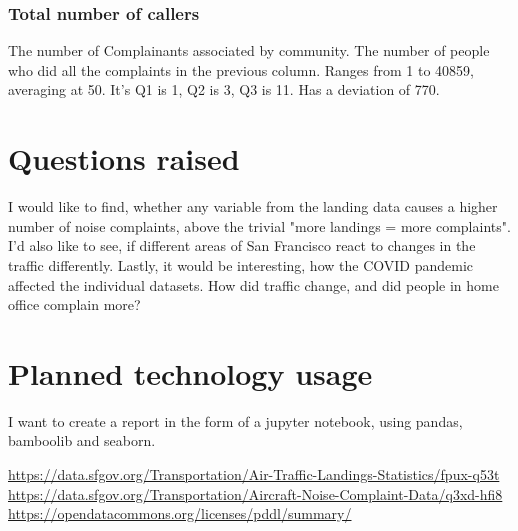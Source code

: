 \documentclass[a4paper,11pt]{article}
\begin{document}
        \subsubsection{Total number of callers}
        The number of Complainants associated by community. The number of people who did all the complaints
        in the previous column.
        Ranges from 1 to 40859, averaging at 50. It's Q1 is 1, Q2 is 3, Q3 is 11. Has a deviation of 770.

    \section{Questions raised}
    I would like to find, whether any variable from the landing data causes a higher number of noise complaints,
    above the trivial "more landings = more complaints". I'd also like to see, if different areas of San
    Francisco react to changes in the traffic differently. Lastly, it would be interesting, how the COVID
    pandemic affected the individual datasets. How did traffic change, and did people in home office complain more?

    \section{Planned technology usage}
    I want to create a report in the form of a jupyter notebook, using pandas, bamboolib and seaborn.


    \begin{thebibliography}{9}
        \url{https://data.sfgov.org/Transportation/Air-Traffic-Landings-Statistics/fpux-q53t}
        \url{https://data.sfgov.org/Transportation/Aircraft-Noise-Complaint-Data/q3xd-hfi8}
        \url{https://opendatacommons.org/licenses/pddl/summary/}
    \end{thebibliography}
\end{document}
